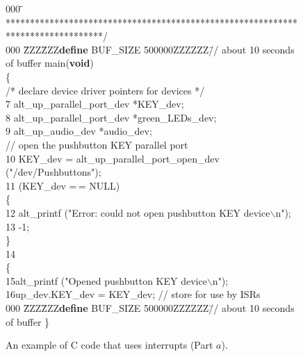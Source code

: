 \documentclass[11pt, twoside, pdftex]{article}
\begin{document}
\begin{figure}[h!]
\begin{center}
\begin{minipage}[t]{12.5 cm}
\begin{tabbing}
000 \=\=\kill\\
\>\>********************************************************************************/\\
000 \=ZZZ\=ZZZ\={\bf define} BUF\_SIZE 500000ZZZZZZ\=// about 10 seconds of buffer  main({\bf void})\\
\>\{\\
\>\>/* declare device driver pointers for devices */\\
7 \>\>alt\_up\_parallel\_port\_dev *KEY\_dev;\\
8 \>\>alt\_up\_parallel\_port\_dev *green\_LEDs\_dev;\\
9 \>\>alt\_up\_audio\_dev *audio\_dev;\\
 
\>\>// open the pushbutton KEY parallel port\\
10 \>\>KEY\_dev = alt\_up\_parallel\_port\_open\_dev ("/dev/Pushbuttons");\\
11 \> (KEY\_dev =$\,$= NULL)\\
\>\>\{\\
12 \>\>\>alt\_printf ("Error: could not open pushbutton KEY device$\backslash$n");\\
13 \>\> -1;\\
\>\>\}\\
14\>\\
\>\>\{\\
15\>\>\>alt\_printf ("Opened pushbutton KEY device$\backslash$n");\\
16\>\>\>up\_dev.KEY\_dev = KEY\_dev;	\>// store for use by ISRs\\
000 \=ZZZ\=ZZZ\={\bf define} BUF\_SIZE 500000ZZZZZZ\=// about 10 seconds of buffer \kill
\>\>\}\\
\end{tabbing}
\end{minipage}
\end{center}
	\vspace{-0.33in}\caption{An example of C code that uses interrupts (Part $a$).}
   \label{fig:interrupts_HAL}
\end{figure}
\clearpage
\end{document}
